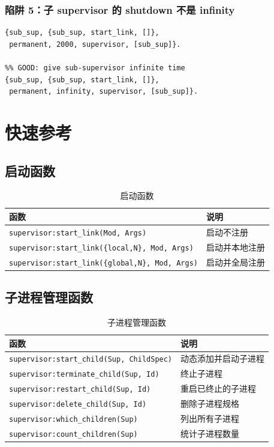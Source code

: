 \documentclass[a4paper,11pt]{article}
\begin{document}
\subsubsection{陷阱 5：子 supervisor 的 shutdown 不是 infinity}

\begin{lstlisting}[style=erlangstyle]
%% BAD: sub-supervisor may be killed before children shut down
{sub_sup, {sub_sup, start_link, []},
 permanent, 2000, supervisor, [sub_sup]}.

%% GOOD: give sub-supervisor infinite time
{sub_sup, {sub_sup, start_link, []},
 permanent, infinity, supervisor, [sub_sup]}.
\end{lstlisting}


\section{快速参考}

\subsection{启动函数}

\begin{table}[H]
\centering
\begin{tabular}{@{}ll@{}}
\toprule
\textbf{函数} & \textbf{说明} \\
\midrule
\texttt{supervisor:start\_link(Mod, Args)} & 启动不注册 \\
\texttt{supervisor:start\_link(\{local,N\}, Mod, Args)} & 启动并本地注册 \\
\texttt{supervisor:start\_link(\{global,N\}, Mod, Args)} & 启动并全局注册 \\
\bottomrule
\end{tabular}
\caption{启动函数}
\end{table}

\subsection{子进程管理函数}

\begin{table}[H]
\centering
\begin{tabular}{@{}ll@{}}
\toprule
\textbf{函数} & \textbf{说明} \\
\midrule
\texttt{supervisor:start\_child(Sup, ChildSpec)} & 动态添加并启动子进程 \\
\texttt{supervisor:terminate\_child(Sup, Id)} & 终止子进程 \\
\texttt{supervisor:restart\_child(Sup, Id)} & 重启已终止的子进程 \\
\texttt{supervisor:delete\_child(Sup, Id)} & 删除子进程规格 \\
\texttt{supervisor:which\_children(Sup)} & 列出所有子进程 \\
\texttt{supervisor:count\_children(Sup)} & 统计子进程数量 \\
\bottomrule
\end{tabular}
\caption{子进程管理函数}
\end{table}
\end{document}
